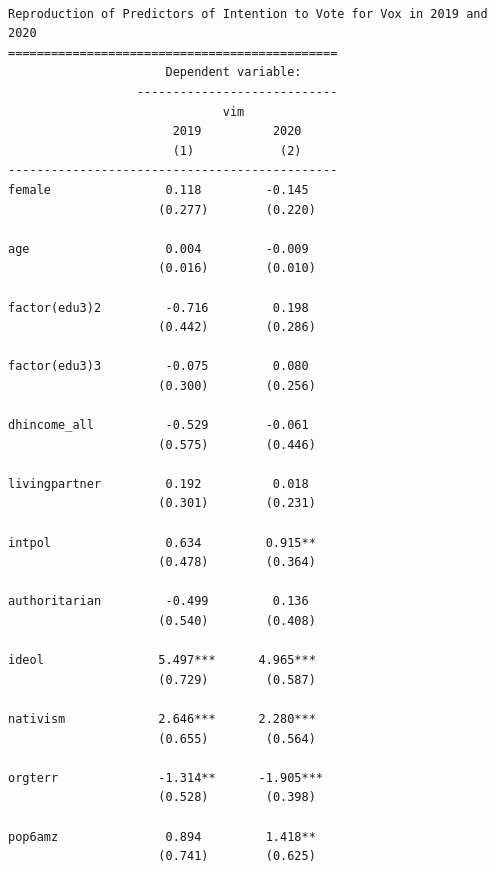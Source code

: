 \documentclass[
  letterpaper,
  DIV=11,
  numbers=noendperiod]{scrartcl}
\begin{document}
\begin{verbatim}

Reproduction of Predictors of Intention to Vote for Vox in 2019 and 2020
==============================================
                      Dependent variable:     
                  ----------------------------
                              vim             
                       2019          2020     
                       (1)            (2)     
----------------------------------------------
female                0.118         -0.145    
                     (0.277)        (0.220)   
                                              
age                   0.004         -0.009    
                     (0.016)        (0.010)   
                                              
factor(edu3)2         -0.716         0.198    
                     (0.442)        (0.286)   
                                              
factor(edu3)3         -0.075         0.080    
                     (0.300)        (0.256)   
                                              
dhincome_all          -0.529        -0.061    
                     (0.575)        (0.446)   
                                              
livingpartner         0.192          0.018    
                     (0.301)        (0.231)   
                                              
intpol                0.634         0.915**   
                     (0.478)        (0.364)   
                                              
authoritarian         -0.499         0.136    
                     (0.540)        (0.408)   
                                              
ideol                5.497***      4.965***   
                     (0.729)        (0.587)   
                                              
nativism             2.646***      2.280***   
                     (0.655)        (0.564)   
                                              
orgterr              -1.314**      -1.905***  
                     (0.528)        (0.398)   
                                              
pop6amz               0.894         1.418**   
                     (0.741)        (0.625)   
                                              

\end{verbatim}
\end{document}
